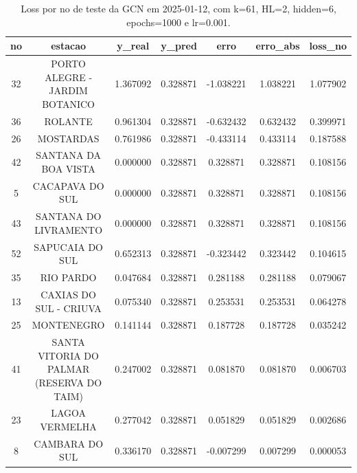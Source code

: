 \begin{table}[h]
\centering
\caption{Loss por no de teste da GCN em 2025-01-12, com k=61, HL=2, hidden=6, epochs=1000 e lr=0.001.}
\label{tab:gcn_loss_k61_hl2_h6_e1000_d20250112}
\begin{tabular}{ccccccc}
\toprule
no & estacao & y\_real & y\_pred & erro & erro\_abs & loss\_no \\
\midrule
32 & PORTO ALEGRE - JARDIM BOTANICO & 1.367092 & 0.328871 & -1.038221 & 1.038221 & 1.077902 \\
36 & ROLANTE & 0.961304 & 0.328871 & -0.632432 & 0.632432 & 0.399971 \\
26 & MOSTARDAS & 0.761986 & 0.328871 & -0.433114 & 0.433114 & 0.187588 \\
42 & SANTANA DA BOA VISTA & 0.000000 & 0.328871 & 0.328871 & 0.328871 & 0.108156 \\
5 & CACAPAVA DO SUL & 0.000000 & 0.328871 & 0.328871 & 0.328871 & 0.108156 \\
43 & SANTANA DO LIVRAMENTO & 0.000000 & 0.328871 & 0.328871 & 0.328871 & 0.108156 \\
52 & SAPUCAIA DO SUL & 0.652313 & 0.328871 & -0.323442 & 0.323442 & 0.104615 \\
35 & RIO PARDO & 0.047684 & 0.328871 & 0.281188 & 0.281188 & 0.079067 \\
13 & CAXIAS DO SUL - CRIUVA & 0.075340 & 0.328871 & 0.253531 & 0.253531 & 0.064278 \\
25 & MONTENEGRO & 0.141144 & 0.328871 & 0.187728 & 0.187728 & 0.035242 \\
41 & SANTA VITORIA DO PALMAR (RESERVA DO TAIM) & 0.247002 & 0.328871 & 0.081870 & 0.081870 & 0.006703 \\
23 & LAGOA VERMELHA & 0.277042 & 0.328871 & 0.051829 & 0.051829 & 0.002686 \\
8 & CAMBARA DO SUL & 0.336170 & 0.328871 & -0.007299 & 0.007299 & 0.000053 \\
\bottomrule
\end{tabular}
\end{table}
